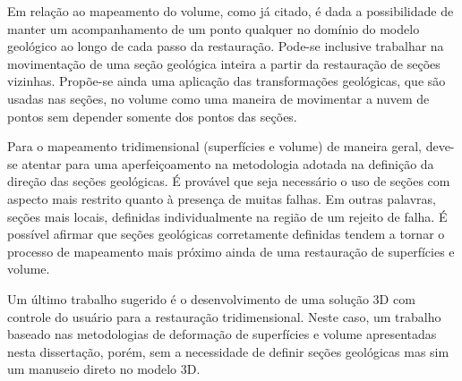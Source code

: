 Em relação ao mapeamento do volume, como já citado, é dada a possibilidade de manter um acompanhamento de um ponto qualquer no domínio do modelo geológico ao longo de cada passo da restauração. Pode-se inclusive trabalhar na movimentação de uma seção geológica inteira a partir da restauração de seções vizinhas. Propõe-se ainda uma aplicação das transformações geológicas, que são usadas nas seções, no volume como uma maneira de movimentar a nuvem de pontos sem depender somente dos pontos das seções.

Para o mapeamento tridimensional (superfícies e volume) de maneira geral, deve-se atentar para uma aperfeiçoamento na metodologia adotada na definição da direção das seções geológicas. É provável que seja necessário o uso de seções com aspecto mais restrito quanto à presença de muitas falhas. Em outras palavras, seções mais locais, definidas individualmente na região de um rejeito de falha. É possível afirmar que seções geológicas corretamente definidas tendem a tornar o processo de mapeamento mais próximo ainda de uma restauração de superfícies e volume.

Um último trabalho sugerido é o desenvolvimento de uma solução 3D com controle do usuário para a restauração tridimensional. Neste caso, um trabalho baseado nas metodologias de deformação de superfícies e volume apresentadas nesta dissertação, porém, sem a necessidade de definir seções geológicas mas sim um manuseio direto no modelo 3D.